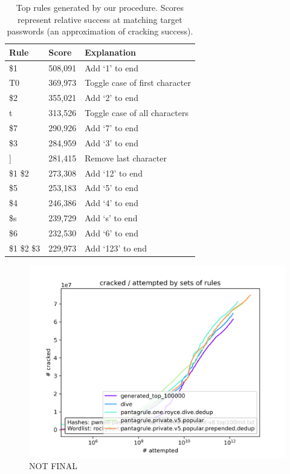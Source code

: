\documentclass[letterpaper,twocolumn,10pt]{article}
\begin{document}

\begin{table}
\centering
\begin{tabular}{|l|l|l|}
\hline
Rule & Score & Explanation \\
\hline
\$1 & 508,091 & Add `1' to end \\
T0 & 369,973 & Toggle case of first character \\
\$2 & 355,021 & Add `2' to end \\
t & 313,526 & Toggle case of all characters \\
\$7 & 290,926 & Add `7' to end \\
\$3 & 284,959 & Add `3' to end \\
] & 281,415 & Remove last character \\
\$1 \$2 & 273,308 & Add `12' to end \\
\$5 & 253,183 & Add `5' to end \\
\$4 & 246,386 & Add `4' to end \\
\$s & 239,729 & Add `s' to end \\
\$6 & 232,530 & Add `6' to end \\
\$1 \$2 \$3 & 229,973 & Add `123' to end \\
\hline
\end{tabular}
\caption{Top rules generated by our procedure. Scores represent relative
success at matching target passwords (an approximation of cracking success).}
\label{tab:top_rules}
\end{table}

\begin{figure}[h]
    \includegraphics[width=\linewidth]
    {../cracked_attempted_plot_08318a9a-a503-11ed-9d73-005056c00001.png}
    \caption{NOT FINAL}
    \label{fig:cracked-attempted}
\end{figure}
\end{document}
